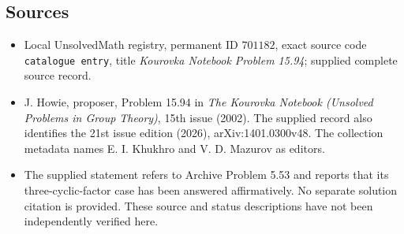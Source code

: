 \documentclass[11pt]{article}
\begin{document}
\subsection{Sources}
\begin{itemize}
\item Local UnsolvedMath registry, permanent ID \(701182\), exact source code \texttt{catalogue entry}, title \emph{Kourovka Notebook Problem 15.94}; supplied complete source record.
\item J. Howie, proposer, Problem 15.94 in \emph{The Kourovka Notebook (Unsolved Problems in Group Theory)}, 15th issue (2002). The supplied record also identifies the 21st issue edition (2026), arXiv:1401.0300v48. The collection metadata names E. I. Khukhro and V. D. Mazurov as editors.
\item The supplied statement refers to Archive Problem 5.53 and reports that its three-cyclic-factor case has been answered affirmatively. No separate solution citation is provided. These source and status descriptions have not been independently verified here.
\end{itemize}
\end{document}
